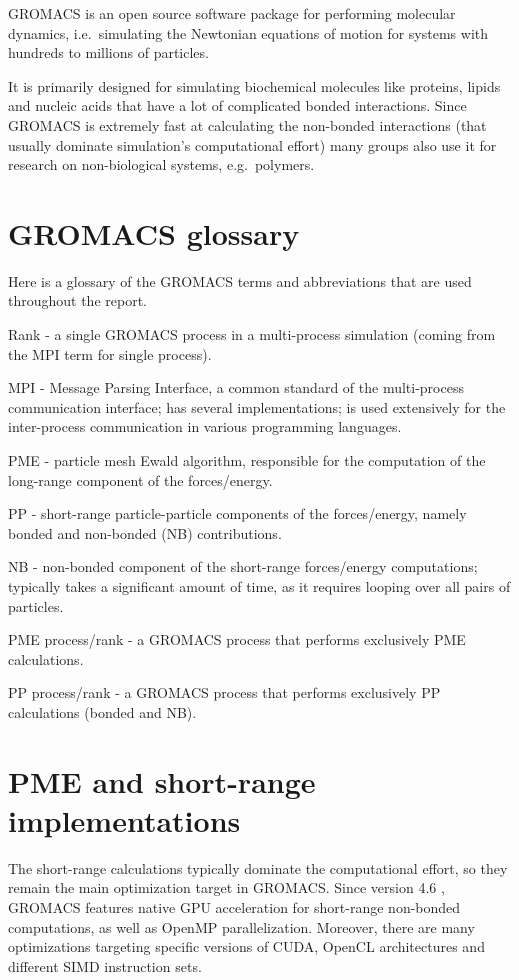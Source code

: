 \documentclass[12pt,a4paper]{report}
\begin{document}
GROMACS \cite{gromacshome} is an open source software package for performing molecular dynamics, i.e.~simulating the Newtonian equations of motion for systems with hundreds to millions of particles. 

It is primarily designed for simulating biochemical molecules like proteins, lipids and nucleic acids that have a lot of complicated bonded interactions. Since GROMACS is extremely fast at calculating the non-bonded interactions (that usually dominate simulation's computational effort) many groups also use it for research on non-biological systems, e.g.~polymers.

\section{GROMACS glossary}
Here is a glossary of the GROMACS terms and abbreviations that are used throughout the report.

Rank - a single GROMACS process in a multi-process simulation (coming from the MPI term for single process).

MPI - Message Parsing Interface, a common standard of the multi-process communication interface; has several implementations; is used extensively for the inter-process communication in various programming languages.

PME - particle mesh Ewald algorithm, responsible for the computation of the long-range component of the forces/energy.

PP - short-range particle-particle components of the forces/energy, namely bonded and non-bonded (NB) contributions.

NB - non-bonded component of the short-range forces/energy computations; typically takes a significant amount of time, as it requires looping over all pairs of particles. 

PME process/rank - a GROMACS process that performs exclusively PME calculations.

PP process/rank - a GROMACS process that performs exclusively PP calculations (bonded and NB).  

\section{PME and short-range implementations} \label{rangeimpl}

The short-range calculations typically dominate the computational effort, so they remain the main optimization target in GROMACS. Since version 4.6 \cite{gromacs46}, GROMACS features native GPU acceleration for short-range non-bonded computations, as well as OpenMP parallelization. Moreover, there are many optimizations targeting specific versions of CUDA, OpenCL architectures and different SIMD instruction sets. 
\end{document}
